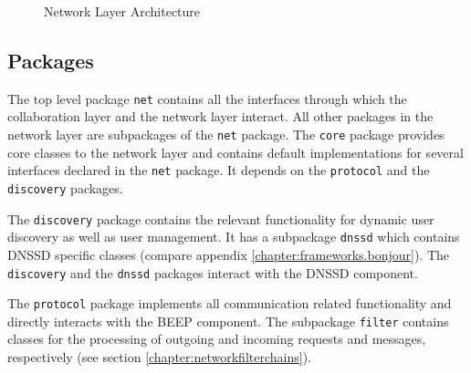 \begin{figure}[H]
 \centering
 \caption{Network Layer Architecture}
 \label{fig:network.architecture}
\end{figure}


\subsection{Packages}

The top level package \texttt{net} contains all the interfaces through which the collaboration layer and the network layer interact. All other packages in the network layer are subpackages of the \texttt{net} package. The \texttt{core} package provides core classes to the network layer and contains default implementations for several interfaces declared in the \texttt{net} package. It depends on the \texttt{protocol} and the \texttt{discovery} packages.

The \texttt{discovery} package contains the relevant functionality for dynamic user discovery as well as user management. It has a subpackage \texttt{dnssd} which contains DNSSD specific classes (compare appendix \ref{chapter:frameworks.bonjour}). The \texttt{discovery} and the \texttt{dnssd} packages interact with the DNSSD component.

The \texttt{protocol} package implements all communication related functionality and directly interacts with the BEEP component. The subpackage \texttt{filter} contains classes for the processing of outgoing and incoming requests and messages, respectively (see section \ref{chapter:networkfilterchains}).

